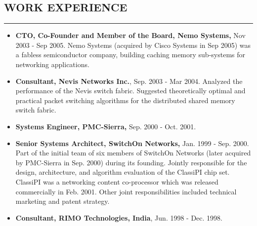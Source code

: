 \documentclass[10pt,a4]{article}
\begin{document}
\begin{small}
\subsection*{WORK EXPERIENCE}
\hrule
\vspace{0.2cm}
\begin{itemize}
\item {\bf CTO, Co-Founder and Member of the Board, Nemo Systems,} Nov
2003 - Sep 2005. Nemo Systems (acquired by Cisco Systems in Sep 2005) 
was a fabless semiconductor company, building caching memory sub-systems 
for networking applications. 

\item {\bf Consultant, Nevis Networks Inc.}, Sep. 2003 - Mar 2004.
Analyzed the performance of the Nevis switch fabric. Suggested
theoretically optimal and practical packet switching algorithms for the
distributed shared memory switch fabric.

\item {\bf Systems Engineer, PMC-Sierra,} Sep. 2000 - Oct. 2001.

\item {\bf Senior Systems Architect, SwitchOn Networks,} Jan. 1999 - Sep. 2000.
Part of the initial team of six members of SwitchOn Networks (later acquired by PMC-Sierra in Sep. 2000) during
its founding. Jointly responsible for the design, architecture, and algorithm evaluation of the ClassiPI chip set.
ClassiPI was a networking content co-processor which was released commercially in Feb. 2001. Other joint
responsibilities included technical marketing and patent strategy.

\item {\bf Consultant, RIMO Technologies, India}, Jun. 1998 - Dec. 1998. \\


\end{itemize}


\end{small}
\end{document}

